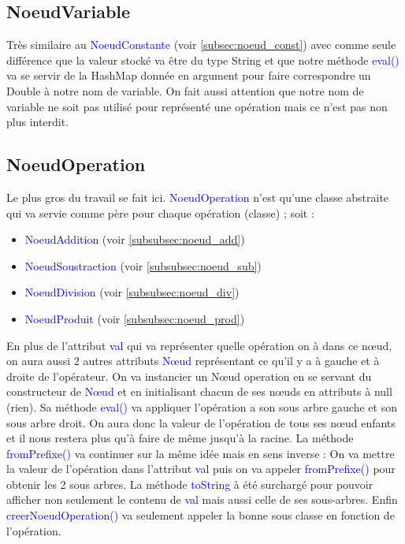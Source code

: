 \documentclass[a4paper]{article}
\renewcommand{\texttt}[2][blue]{\textcolor{#1}{\ttfamily #2}}
\begin{document}
\subsection{NoeudVariable}
\label{subsec:noeud_var}

Très similaire au \texttt{NoeudConstante} (voir \ref{subsec:noeud_const}) avec comme seule différence que la valeur stocké va être du type String et que notre méthode \texttt{eval()} va se servir de la HashMap donnée en argument pour faire correspondre un Double à notre nom de variable. On fait aussi attention que notre nom de variable ne soit pas utilisé pour représenté une opération mais ce n'est pas non plus interdit.

\subsection{NoeudOperation}
\label{subsec:noeud_op}

Le plus gros du travail se fait ici. \texttt{NoeudOperation} n'est qu'une classe abstraite qui va servie comme père pour chaque opération (classe) ; soit :

\vspace{0.5cm}

\begin{itemize}
\item \texttt{NoeudAddition} (voir \ref{subsubsec:noeud_add})
\item \texttt{NoeudSoustraction} (voir \ref{subsubsec:noeud_sub}) 
\item \texttt{NoeudDivision} (voir \ref{subsubsec:noeud_div}) 
\item \texttt{NoeudProduit} (voir \ref{subsubsec:noeud_prod})
\end{itemize}

\begin{multicols}{2}
  
En plus de l'attribut \texttt{val} qui va représenter quelle opération on à dans ce nœud, on aura aussi 2 autres attributs \texttt{Nœud} représentant ce qu'il y a à gauche et à droite de l'opérateur. On va instancier un Nœud operation en se servant du constructeur de \texttt{Nœud} et en initialisant chacun de ses nœuds en attributs à null (rien). Sa méthode \texttt{eval()} va appliquer l’opération a son sous arbre gauche et son sous arbre droit. On aura donc la valeur de l'opération de tous ses nœud enfants et il nous restera plus qu'à faire de même jusqu'à la racine. La méthode \texttt{fromPrefixe()} va continuer sur la même idée mais en sens inverse : On va mettre la valeur de l'opération dans l'attribut \texttt{val} puis on va appeler \texttt{fromPrefixe()} pour obtenir les 2 sous arbres. La méthode \texttt{toString} à été surchargé pour pouvoir afficher non seulement le contenu de \texttt{val} mais aussi celle de ses sous-arbres. Enfin \texttt{creerNoeudOperation()} va seulement appeler la bonne sous classe en fonction de l'opération.
\end{multicols}
\end{document}
